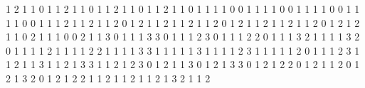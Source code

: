     {1}  {2} {1} {1} {0} {1}   %
   {1}  {2} {1} {1} {0} {1}   %
   {1}  {2} {1} {1} {0} {1}   %
   {1}  {2} {1} {1} {0} {1}   %
   {1}  {1} {1} {0} {0} {1}   %
   {1}  {1} {1} {0} {0} {1}   %
   {1}  {1} {1} {0} {0} {1}   %
   {1}  {1} {1} {0} {0} {1}   %
   {1}  {1} {2} {1} {1} {2}   %
  {1}  {1} {2} {0} {1} {2}   %
  {1}  {1} {2} {1} {1} {2}   %
  {1}  {1} {2} {0} {1} {2}   %
  {1}  {1} {2} {1} {1} {2}   %
  {1}  {1} {2} {0} {1} {2}   %
  {1}  {2} {1} {1} {0} {2}   %
  {1}  {1} {1} {0} {0} {2}   %
    {1}  {1} {3} {0} {1} {1}   %
    {1}  {3} {3} {0} {1} {1}   %
    {1}  {2} {3} {0} {1} {1}   %
   {1}  {2} {2} {0} {1} {1}   %
   {1}  {3} {2} {1} {1} {1}   %
   {1}  {3} {2} {0} {1} {1}   %
   {1}  {1} {2} {1} {1} {1}   %
   {1}  {2} {2} {1} {1} {1}   %
   {1}  {3} {3} {1} {1} {1}   %
   {1}  {1} {3} {1} {1} {1}   %
   {1}  {2} {3} {1} {1} {1}   %
  {1}  {1} {2} {0} {1} {1}   %
  {1}  {2} {3} {1} {1} {2}   %
  {1}  {1} {3} {1} {1} {2}   %
  {1}  {3} {3} {1} {1} {2}   %
  {1}  {2} {3} {0} {1} {2}   %
  {1}  {1} {3} {0} {1} {2}   %
  {1}  {3} {3} {0} {1} {2}   %
  {1}  {2} {2} {0} {1} {2}   %
  {1}  {1} {2} {0} {1} {2}   %
  {1}  {3} {2} {0} {1} {2}   %
  {1}  {2} {2} {1} {1} {2}   %
  {1}  {1} {2} {1} {1} {2}   %
  {1}  {3} {2} {1} {1} {2}   %
